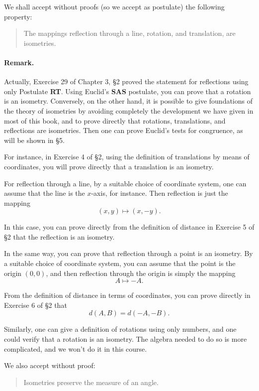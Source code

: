 \documentclass[12pt]{book} %
\begin{document}
\begin{ExerciseList}
We shall accept without proofs (so we accept as postulate) the following property:

\begin{quote}
The mappings reflection through a line, rotation, and translation, are isometries.
\end{quote}

\paragraph{Remark.}
Actually, Exercise 29 of Chapter 3, \S2 proved the statement for reflections using only Postulate \textbf{RT}. Using Euclid's \textbf{SAS} postulate, you can prove that a rotation is an isometry. Conversely, on the other hand, it is possible to give foundations of the theory of isometries by avoiding completely the development we have given in most of this book, and to prove directly that rotations, translations, and reflections are isometries. Then one can prove Euclid's tests for congruence, as will be shown in \S5.

For instance, in Exercise 4 of \S2, using the definition of translations by means of coordinates, you will prove directly that a translation is an isometry.

For reflection through a line, by a suitable choice of coordinate system, one can assume that the line is the $x$-axis, for instance. Then reflection is just the mapping
\[
(x,y)\longmapsto(x,-y).
\]

In this case, you can prove directly from the definition of distance in Exercise 5 of \S2 that the reflection is an isometry.

In the same way, you can prove that reflection through a point is an isometry. By a suitable choice of coordinate system, you can assume that the point is the origin $(0,0)$, and then reflection through the origin is simply the mapping
\[
A\longmapsto -A.
\]

From the definition of distance in terms of coordinates, you can prove directly in Exercise 6 of \S2 that
\[
d(A,B)=d(-A,-B).
\]

Similarly, one can give a definition of rotations using only numbers, and one could verify that a rotation is an isometry. The algebra needed to do so is more complicated, and we won't do it in this course.

We also accept without proof:

\begin{quote}
Isometries preserve the measure of an angle.
\end{quote}


\end{ExerciseList}
\end{document}
